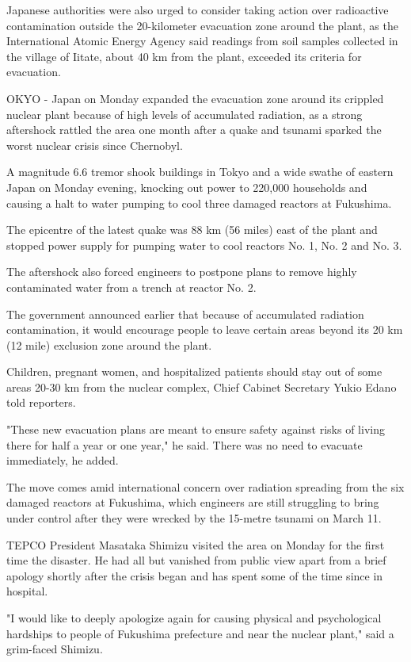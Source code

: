 Japanese authorities were also urged to consider taking action over radioactive contamination outside the 20-kilometer evacuation zone around the plant, as the International Atomic Energy Agency said readings from soil samples collected in the village of Iitate, about 40 km from the plant, exceeded its criteria for evacuation.

OKYO - Japan on Monday expanded the evacuation zone around its crippled nuclear plant because of high levels of accumulated radiation, as a strong aftershock rattled the area one month after a quake and tsunami sparked the worst nuclear crisis since Chernobyl.

A magnitude 6.6 tremor shook buildings in Tokyo and a wide swathe of eastern Japan on Monday evening, knocking out power to 220,000 households and causing a halt to water pumping to cool three damaged reactors at Fukushima.

The epicentre of the latest quake was 88 km (56 miles) east of the plant and stopped power supply for pumping water to cool reactors No. 1, No. 2 and No. 3.

The aftershock also forced engineers to postpone plans to remove highly contaminated water from a trench at reactor No. 2.

The government announced earlier that because of accumulated radiation contamination, it would encourage people to leave certain areas beyond its 20 km (12 mile) exclusion zone around the plant.

Children, pregnant women, and hospitalized patients should stay out of some areas 20-30 km from the nuclear complex, Chief Cabinet Secretary Yukio Edano told reporters.

"These new evacuation plans are meant to ensure safety against risks of living there for half a year or one year," he said. There was no need to evacuate immediately, he added.

The move comes amid international concern over radiation spreading from the six damaged reactors at Fukushima, which engineers are still struggling to bring under control after they were wrecked by the 15-metre tsunami on March 11.

TEPCO President Masataka Shimizu visited the area on Monday for the first time the disaster. He had all but vanished from public view apart from a brief apology shortly after the crisis began and has spent some of the time since in hospital.

"I would like to deeply apologize again for causing physical and psychological hardships to people of Fukushima prefecture and near the nuclear plant," said a grim-faced Shimizu.

